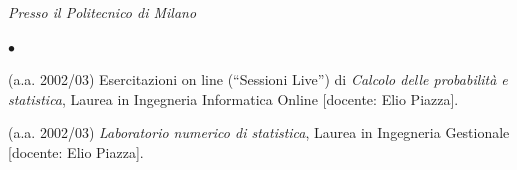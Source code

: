 \documentclass[a4paper,11pt,oneside]{amsart}
\newenvironment{myitemize}{%
\begin{list}{$\bullet$}%
 	{%
	\setlength{\itemsep}{0.3em}%
	\setlength{\topsep}{0.3em}%
	\setlength{\partopsep}{0em}%
	\setlength{\parsep}{0em}%
	\setlength{\parskip}{0em}%
	\setlength\leftmargin{1.5em}%
	\setlength\labelwidth{1.1em}%
	\setlength{\labelsep}{0.4em}%
	}%
	}%
{\end{list}}
\renewenvironment{itemize}{
\begin{myitemize}}%
{\end{myitemize}}
\begin{document}


\smallskip
\emph{Presso il Politecnico di Milano}

\begin{itemize}

\item (a.a. 2002/03) Esercitazioni on line (``Sessioni Live'') di
\textit{Calcolo delle probabilità e statistica},
Laurea in Ingegneria Informatica Online [docente: Elio Piazza].

\item (a.a. 2002/03) \textit{Laboratorio numerico di statistica},
Laurea in Ingegneria Gestionale [docente: Elio Piazza].
\end{itemize}

%
%
%
%
% 
%
%
%
%
%
%
%
\end{document}
